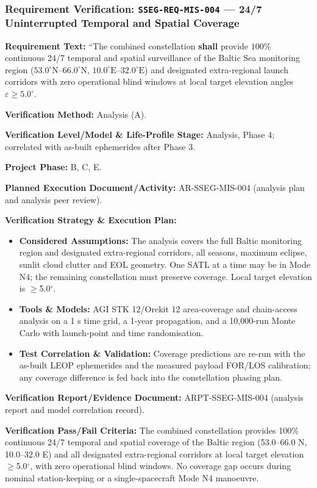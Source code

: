 \subsubsection{Requirement Verification: \texttt{SSEG-REQ-MIS-004} --- 24/7 Uninterrupted Temporal and Spatial Coverage}
\label{ver:SSEG-REQ-MIS-004}
\textbf{Requirement Text:} ``The combined  constellation \textbf{shall} provide $100\%$ continuous 24/7 temporal and spatial surveillance of the Baltic Sea monitoring region ($53.0^\circ\text{N}\text{--}66.0^\circ\text{N}$, $10.0^\circ\text{E}\text{--}32.0^\circ\text{E}$) and designated extra-regional launch corridors with zero operational blind windows at local target elevation angles $\varepsilon \ge 5.0^\circ$.
\par\textbf{Verification Method:} Analysis (A).
\par\textbf{Verification Level/Model \& Life-Profile Stage:} Analysis, Phase 4; correlated with as-built ephemerides after Phase 3.
\par\textbf{Project Phase:} B, C, E.
\par\textbf{Planned Execution Document/Activity:} AR-SSEG-MIS-004 (analysis plan and analysis peer review).
\par\textbf{Verification Strategy \& Execution Plan:}
\begin{itemize}
\item \textbf{Considered Assumptions:} The analysis covers the full Baltic monitoring region and designated extra-regional corridors, all seasons, maximum eclipse, sunlit cloud clutter and EOL geometry. One SATL at a time may be in Mode N4; the remaining constellation must preserve coverage. Local target elevation is $\ge$5.0$^\circ$.
\item \textbf{Tools \& Models:} AGI STK 12/Orekit 12 area-coverage and chain-access analysis on a 1 s time grid, a 1-year propagation, and a 10,000-run Monte Carlo with launch-point and time randomisation.
\item \textbf{Test Correlation \& Validation:} Coverage predictions are re-run with the as-built LEOP ephemerides and the measured payload FOR/LOS calibration; any coverage difference is fed back into the constellation phasing plan.
\end{itemize}
\par\textbf{Verification Report/Evidence Document:} ARPT-SSEG-MIS-004 (analysis report and model correlation record).
\par\textbf{Verification Pass/Fail Criteria:} The combined constellation provides 100\% continuous 24/7 temporal and spatial coverage of the Baltic region (53.0--66.0 N, 10.0--32.0 E) and all designated extra-regional corridors at local target elevation $\ge$5.0$^\circ$, with zero operational blind windows. No coverage gap occurs during nominal station-keeping or a single-spacecraft Mode N4 manoeuvre.
\par\medskip
